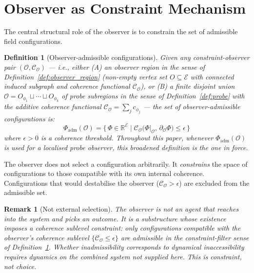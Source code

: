\documentclass[12pt]{article}
\newtheorem{definition}[theorem]{Definition}
\newtheorem{remark}[theorem]{Remark}
\newcommand{\Ecal}{\mathcal{E}}
\newcommand{\Ocal}{\mathcal{O}}
\newcommand{\Ccal}{\mathcal{C}}
\begin{document}
\section{Observer as Constraint Mechanism}\label{sec:constraint}

The central structural role of the observer is to constrain the set of admissible field configurations.

\begin{definition}[Observer-admissible configurations]\label{def:admissible}
Given any constraint-observer pair $(\Ocal, \Ccal_\Ocal)$ --- i.e., either (A) an observer region in the sense of Definition~\ref{def:observer_region} (non-empty vertex set $O \subseteq \Ecal$ with connected induced subgraph and coherence functional $\Ccal_\Ocal$), or (B) a finite disjoint union $\Ocal = O_{\phi_1} \sqcup \cdots \sqcup O_{\phi_k}$ of probe subregions in the sense of Definition~\ref{def:probe} with the additive coherence functional $\Ccal_\Ocal = \sum_j c_{\phi_j}$ --- the set of \textit{observer-admissible configurations} is:
\begin{equation}\label{eq:admissible}
    \Phi_{\mathrm{adm}}(\Ocal) = \bigl\{\, \Phi \in \mathbb{R}^\Ecal \;\big|\; \Ccal_\Ocal\!\bigl(\Phi|_\Ocal,\, \partial_\Ocal \Phi\bigr) \leq \epsilon \,\bigr\}
\end{equation}
where $\epsilon > 0$ is a coherence threshold. Throughout this paper, whenever $\Phi_{\mathrm{adm}}(\Ocal)$ is used for a localised probe observer, this broadened definition is the one in force.
\end{definition}

The observer does not select a configuration arbitrarily. It \textit{constrains} the space of configurations to those compatible with its own internal coherence. Configurations that would destabilise the observer ($\Ccal_\Ocal > \epsilon$) are excluded from the admissible set.

\begin{remark}[Not external selection]
The observer is not an agent that reaches into the system and picks an outcome. It is a substructure whose existence imposes a coherence sublevel constraint: only configurations compatible with the observer's coherence sublevel $\{\Ccal_\Ocal \leq \epsilon\}$ are admissible in the constraint-filter sense of Definition~\ref{def:admissible}. Whether inadmissibility corresponds to dynamical inaccessibility requires dynamics on the combined system not supplied here. This is constraint, not choice.
\end{remark}
\end{document}
